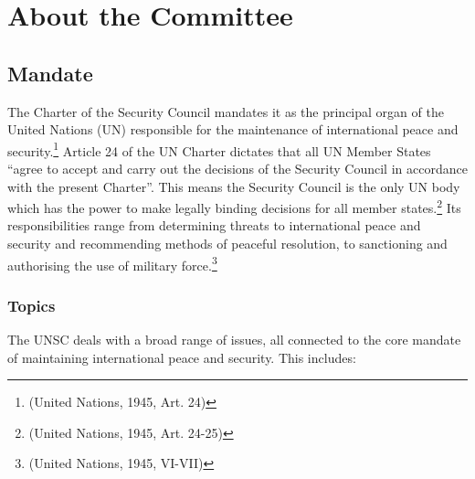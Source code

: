 \section{About the Committee}

\subsection{Mandate}

The Charter of the Security Council mandates it as the principal organ of the United Nations (UN) responsible for the maintenance of international peace and security.\footnote{(United Nations, 1945, Art. 24)} Article 24 of the UN Charter dictates that all UN Member States “agree to accept and carry out the decisions of the Security Council in accordance with the present Charter”. This means the Security Council is the only UN body which has the power to make legally binding decisions for all member states.\footnote{(United Nations, 1945, Art. 24-25)} Its responsibilities range from determining threats to international peace and security and recommending methods of peaceful resolution, to sanctioning and authorising the use of military force.\footnote{(United Nations, 1945, VI-VII)}

\subsubsection{Topics}

The UNSC deals with a broad range of issues, all connected to the core mandate of maintaining international peace and security. This includes:

